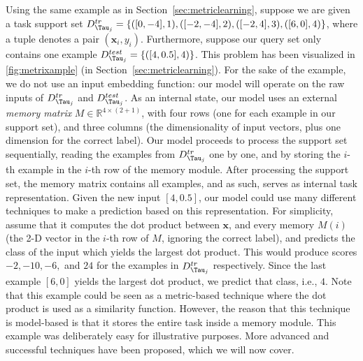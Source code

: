 Using the same example as in Section~\ref{sec:metriclearning}, suppose we are given a task support set $D^{tr}_{\Tau_{j}} = \{ ([0,-4], 1), ([-2,-4],2), ([-2,4],3), ([6,0], 4) \}$, where a tuple denotes a pair $(\boldsymbol{x}_{i},y_{i})$. Furthermore, suppose our query set only contains one example $D^{test}_{\Tau_{j}} = \{ ([4, 0.5], 4) \}$. This problem has been visualized in \autoref{fig:metrixample} (in Section~\ref{sec:metriclearning}). For the sake of the example, we do not use an input embedding function: our model will operate on the raw inputs of $D^{tr}_{\Tau_{j}}$ and $D^{test}_{\Tau_{j}}$. As an internal state, our model uses an external \textit{memory matrix} $M \in \mathbb{R}^{4 \times (2+1)}$, with four rows (one for each example in our support set), and three columns (the dimensionality of input vectors, plus one dimension for the correct label). Our model proceeds to process the support set sequentially, reading the examples from $D^{tr}_{\Tau_{j}}$ one by one, and by storing the $i$-th example in the $i$-th row of the memory module. After processing the support set, the memory matrix contains all examples, and as such, serves as internal task representation.
Given the new input $[4,0.5]$, our model could use many different techniques to make a prediction based on this representation. For simplicity, assume that it computes the dot product between $\boldsymbol{x}$, and every memory $M(i)$ (the 2-D vector in the $i$-th row of $M$, ignoring the correct label), and predicts the class of the input which yields the largest dot product. This would produce scores $-2, -10, -6,$ and $24$ for the examples in $D^{tr}_{\Tau_{j}}$ respectively. Since the last example $[6,0]$ yields the largest dot product, we predict that class, i.e., $4$. 
Note that this example could be seen as a metric-based technique where the dot product is used as a similarity function.
However, the reason that this technique is model-based is that it stores the entire task inside a memory module. 
This example was deliberately easy for illustrative purposes. More advanced and successful techniques have been proposed, which we will now cover.

